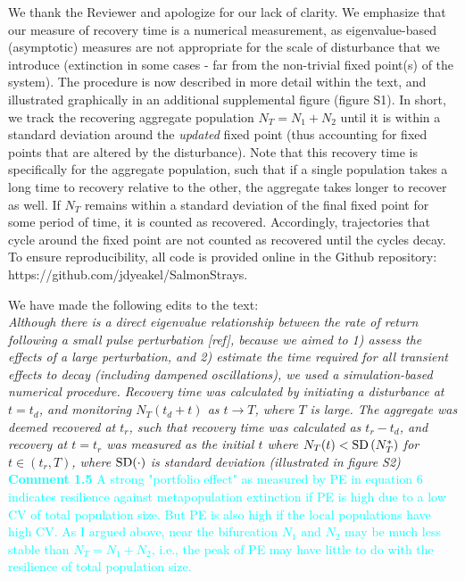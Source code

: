 \documentclass[ucm,12pt]{ucletter}
\begin{document}
\begin{letter}
 We thank the Reviewer and apologize for our lack of clarity. We emphasize that our measure of recovery time is a numerical measurement, as eigenvalue-based (asymptotic) measures are not appropriate for the scale of disturbance that we introduce (extinction in some cases - far from the non-trivial fixed point(s) of the system). The procedure is now described in more detail within the text, and illustrated graphically in an additional supplemental figure (figure S1). In short, we track the recovering aggregate population $N_T=N_1+N_2$ until it is within a standard deviation around the \emph{updated} fixed point (thus accounting for fixed points that are altered by the disturbance). Note that this recovery time is specifically for the aggregate population, such that if a single population takes a long time to recovery relative to the other, the aggregate takes longer to recover as well. If $N_T$ remains within a standard deviation of the final fixed point for some period of time, it is counted as recovered. Accordingly, trajectories that cycle around the fixed point are not counted as recovered until the cycles decay. To ensure reproducibility, all code is provided online in the Github repository: https://github.com/jdyeakel/SalmonStrays.

\noindent We have made the following edits to the text:\\
 \emph{Although there is a direct eigenvalue relationship between the rate of return following a small pulse perturbation [ref], because we aimed to 1) assess the effects of a large perturbation, and 2) estimate the time required for all transient effects to decay (including dampened oscillations), we used a simulation-based numerical procedure.
Recovery time was calculated by initiating a disturbance at $t=t_d$, and monitoring $N_T(t_d+t)$ as $t\rightarrow T$, where $T$ is large. 
The aggregate was deemed recovered at $t_r$, such that recovery time was calculated as $t_r-t_d$, and recovery at $t=t_r$ was measured as the initial $t$ where $N_T(t) < {\rm SD}\left( N_T^* \right)$ for $t\in(t_r,T)$, where $\rm{SD}(\cdot)$ is standard deviation (illustrated in figure S2)}\\

\noindent \textcolor{cyan}{
{\bf Comment 1.5} A strong "portfolio effect" as measured by PE in equation 6 indicates resilience against metapopulation extinction if PE is high due to a low CV of total population size. But PE is also high if the local populations have high CV. As I argued above, near the bifurcation $N_1$ and $N_2$ may be much less stable than $N_T=N_1+N_2$, i.e., the peak of PE may have little to do with the resilience of total population size.
}


\end{letter}
\end{document}

